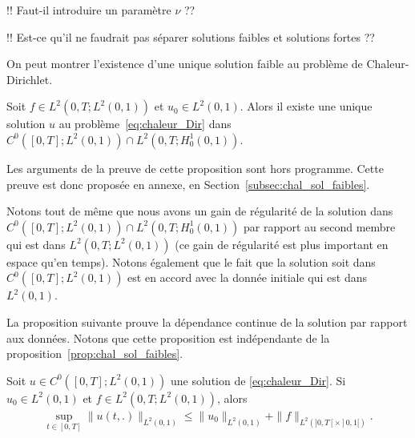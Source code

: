 \documentclass[12pt,a4paper,twoside]{article}
\begin{document}
!! Faut-il introduire un param\`etre $\nu$ ??

!! Est-ce qu'il ne faudrait pas s\'eparer solutions faibles et solutions fortes ??

On peut montrer l'existence d'une unique solution faible au probl\`eme de Chaleur-Dirichlet.


\begin{proposition}
  \label{prop:chal_sol_faibles}
  Soit $f \in L^2(0,T;L^2(0,1))$ et $u_0 \in L^2(0,1)$.
  Alors il existe une unique solution $u$ au probl\`eme~\eqref{eq:chaleur_Dir}
  dans $C^0([0,T];L^2(0,1)) \cap L^2(0,T;H_0^1(0,1))$.
\end{proposition}
Les arguments de la preuve de cette proposition sont hors programme.
Cette preuve est donc propos\'ee en annexe, en Section~\ref{subsec:chal_sol_faibles}.

Notons tout de m\^eme que nous avons un gain de r\'egularit\'e de la solution
dans $C^0([0,T];L^2(0,1)) \cap L^2(0,T;H_0^1(0,1))$
par rapport au second membre qui est dans $L^2(0,T;L^2(0,1))$
(ce gain de r\'egularit\'e est plus important en espace qu'en temps).
Notons \'egalement que le fait que la solution soit dans $C^0([0,T];L^2(0,1))$
est en accord avec la donn\'ee initiale qui est dans $L^2(0,1)$.

La proposition suivante prouve la d\'ependance continue de la solution
par rapport aux donn\'ees.
Notons que cette proposition est ind\'ependante de la
proposition~\ref{prop:chal_sol_faibles}.

\begin{proposition}
  \label{prop:chaleur_continuite_donnees}
  Soit $u \in C^0([0,T];L^2(0,1))$ une solution de \eqref{eq:chaleur_Dir}.
  Si $u_0 \in L^2(0,1)$ et $f \in L^2(0,T; L^2(0,1))$,
  alors 
  \begin{align*}
    \sup_{t \in [0,T]} \| u(t,.) \|_{L^2(0,1)} \leq \| u_0 \|_{L^2(0,1)} + \| f \|_{L^2(]0,T[ \times ]0,1[)} .
  \end{align*}
\end{proposition}
\end{document}
